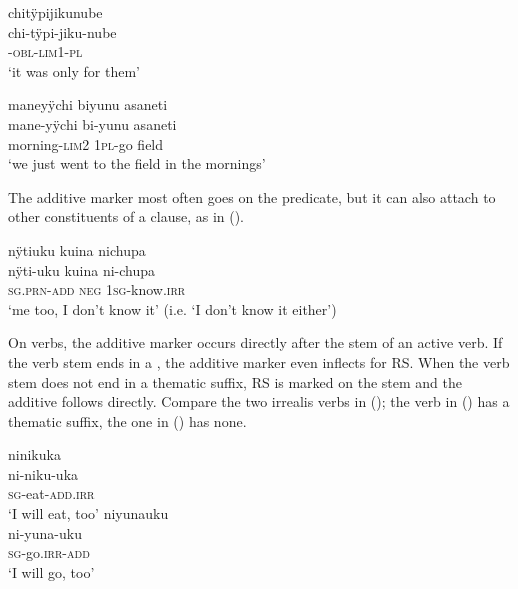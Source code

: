 \ea\label{ex:FirstLim3}
\begingl
\glpreamble chitÿpijikunube\\
\gla chi-tÿpi-jiku-nube\\
-\textsc{obl}-\textsc{lim}1-\textsc{pl}\\
\glft ‘it was only for them’
\endgl
\trailingcitation{[mxx-p181027l-1.028]}
\xe

\ea\label{ex:FirstLim4}
\begingl
\glpreamble maneyÿchi biyunu asaneti\\
\gla mane-yÿchi bi-yunu asaneti\\
\glb morning-\textsc{lim}2 1\textsc{pl}-go field\\
\glft ‘we just went to the field in the mornings’
\endgl
\trailingcitation{[rxx-p181101l-2.147]}
\xe

The additive marker most often goes on the predicate, but it can also attach to other constituents of a clause, as in ().

\ea\label{ex:FirstAdd-1}
\begingl
\glpreamble nÿtiuku kuina nichupa\\
\gla nÿti-uku kuina ni-chupa\\
\textsc{sg.prn}-\textsc{add} \textsc{neg} 1\textsc{sg}-know.\textsc{irr}\\
\glft ‘me too, I don’t know it’ (i.e. ‘I don’t know it either’)
\endgl
\trailingcitation{[cux-c120414ls-2.238]}
\xe

On verbs, the additive marker occurs directly after the stem of an active verb. If the verb stem ends in a , the additive marker even inflects for RS. When the verb stem does not end in a thematic suffix, RS is marked on the stem and the additive follows directly. Compare the two irrealis verbs in (); the verb in () has a thematic suffix, the one in () has none.

\ea\label{ex:FirstAdd-2}
  \ea\label{ex:FirstAdd-2.1}
\begingl
\glpreamble ninikuka\\
\gla ni-niku-uka\\
\textsc{sg}-eat-\textsc{add.irr}\\
\glft ‘I will eat, too’
\endgl
  \ex\label{ex:FirstAdd-2.2}
\begingl
\glpreamble niyunauku\\
\gla ni-yuna-uku\\
\textsc{sg}-go.\textsc{irr}-\textsc{add}\\
\glft ‘I will go, too’
\endgl
\z
\xe

